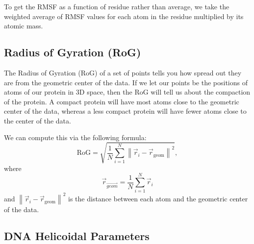 To get the RMSF as a function of residue rather than average, we take the weighted average of RMSF values for each atom in the residue multiplied by its atomic mass.

\subsection{Radius of Gyration (RoG)}

The Radius of Gyration (RoG) of a set of points tells you how spread out they are from the geometric center of the data. If we let our points be the positions of atoms of our protein in 3D space, then the RoG will tell us about the compaction of the protein. A compact protein will have most atoms close to the geometric center of the data, whereas a less compact protein will have fewer atoms close to the center of the data.

\noindent We can compute this via the following formula: \[
\text{RoG} = \sqrt{\frac{1}{N}\sum_{i=1}^{N}\left\lVert \vec{r}_i - \vec{r}_{\mathrm{geom}} \right\rVert^2},
\] where \[
\vec{r}_{\vec{geom}} = \frac{1}{N}\sum_{i=1}^{N}\vec{r}_i
\] and \(\left\lVert \vec{r}_i - \vec{r}_{\mathrm{geom}} \right\rVert^2\) is the distance between each atom and the geometric center of the data.

\subsection{DNA Helicoidal Parameters}

